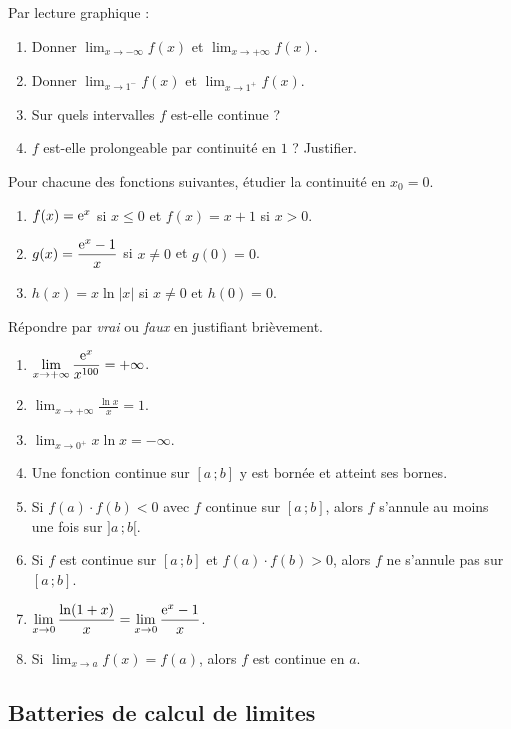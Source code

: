 Par lecture graphique :
\begin{enumerate}
	\item Donner $\displaystyle\lim_{x\to-\infty}f(x)$ et
	$\displaystyle\lim_{x\to+\infty}f(x)$.
	\item Donner $\displaystyle\lim_{x\to 1^-}f(x)$ et
	$\displaystyle\lim_{x\to 1^+}f(x)$.
	\item Sur quels intervalles $f$ est-elle continue ?
	\item $f$ est-elle prolongeable par continuité en $1$ ? Justifier.
\end{enumerate}

Pour chacune des fonctions suivantes, étudier la continuité en $x_0=0$.
\begin{enumerate}
	\item $f(x)=\mathrm{e}^x$ si $x\leq 0$ et $f(x)=x+1$ si $x>0$.
	\item $g(x)=\dfrac{\mathrm{e}^{x}-1}{x}$ si $x\neq 0$ et $g(0)=0$.
	\item $h(x)=x\ln|x|$ si $x\neq 0$ et $h(0)=0$.
\end{enumerate}

Répondre par \emph{vrai} ou \emph{faux} en justifiant brièvement.
\begin{enumerate}
	\item $\displaystyle\lim_{x\to+\infty}\frac{\mathrm{e}^x}{x^{100}}=+\infty$.
	\item $\displaystyle\lim_{x\to+\infty}\frac{\ln x}{x}=1$.
	\item $\displaystyle\lim_{x\to 0^+}x\ln x=-\infty$.
	\item Une fonction continue sur $[a\,;b]$ y est bornée et atteint ses bornes.
	\item Si $f(a)\cdot f(b)<0$ avec $f$ continue sur $[a\,;b]$, alors $f$
	s'annule au moins une fois sur $]a\,;b[$.
	\item Si $f$ est continue sur $[a\,;b]$ et $f(a)\cdot f(b)>0$, alors $f$ ne
	s'annule pas sur $[a\,;b]$.
	\item $\displaystyle\lim_{x\to 0}\frac{\ln(1+x)}{x}=\lim_{x\to 0}\frac{\mathrm{e}^x-1}{x}$.
	\item Si $\displaystyle\lim_{x\to a}f(x)=f(a)$, alors $f$ est continue en $a$.
\end{enumerate}

\subsection{Batteries de calcul de limites}


